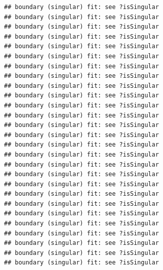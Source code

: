 \documentclass[
]{article}
\newenvironment{Shaded}{\begin{snugshade}}{\end{snugshade}}
\newcommand{\AttributeTok}[1]{\textcolor[rgb]{0.77,0.63,0.00}{#1}}
\newcommand{\ControlFlowTok}[1]{\textcolor[rgb]{0.13,0.29,0.53}{\textbf{#1}}}
\newcommand{\DecValTok}[1]{\textcolor[rgb]{0.00,0.00,0.81}{#1}}
\newcommand{\FloatTok}[1]{\textcolor[rgb]{0.00,0.00,0.81}{#1}}
\newcommand{\FunctionTok}[1]{\textcolor[rgb]{0.00,0.00,0.00}{#1}}
\newcommand{\NormalTok}[1]{#1}
\newcommand{\SpecialCharTok}[1]{\textcolor[rgb]{0.00,0.00,0.00}{#1}}
\newcommand{\StringTok}[1]{\textcolor[rgb]{0.31,0.60,0.02}{#1}}
\begin{document}
\begin{verbatim}
## boundary (singular) fit: see ?isSingular
## boundary (singular) fit: see ?isSingular
## boundary (singular) fit: see ?isSingular
## boundary (singular) fit: see ?isSingular
## boundary (singular) fit: see ?isSingular
## boundary (singular) fit: see ?isSingular
## boundary (singular) fit: see ?isSingular
## boundary (singular) fit: see ?isSingular
## boundary (singular) fit: see ?isSingular
## boundary (singular) fit: see ?isSingular
## boundary (singular) fit: see ?isSingular
## boundary (singular) fit: see ?isSingular
## boundary (singular) fit: see ?isSingular
## boundary (singular) fit: see ?isSingular
## boundary (singular) fit: see ?isSingular
## boundary (singular) fit: see ?isSingular
## boundary (singular) fit: see ?isSingular
## boundary (singular) fit: see ?isSingular
## boundary (singular) fit: see ?isSingular
## boundary (singular) fit: see ?isSingular
## boundary (singular) fit: see ?isSingular
## boundary (singular) fit: see ?isSingular
## boundary (singular) fit: see ?isSingular
## boundary (singular) fit: see ?isSingular
## boundary (singular) fit: see ?isSingular
## boundary (singular) fit: see ?isSingular
## boundary (singular) fit: see ?isSingular
\end{verbatim}

\begin{Shaded}
\end{Shaded}
\end{document}
